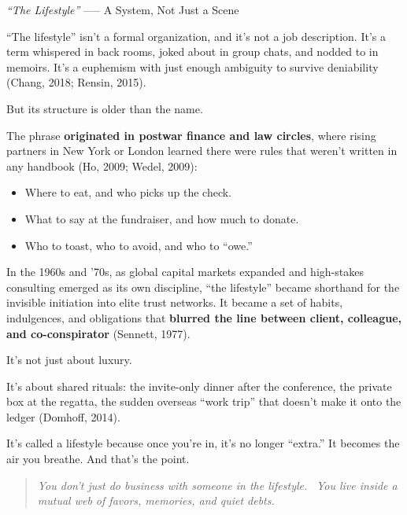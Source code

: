 \begin{HistoricalSidebar}{\textit{“The Lifestyle”} --— A System, Not Just a Scene}

  “The lifestyle” isn’t a formal organization, and it’s not a job description. It’s a term whispered in 
  back rooms, joked about in group chats, and nodded to in memoirs. It's a euphemism with just enough 
  ambiguity to survive deniability (Chang, 2018; Rensin, 2015).

  \medskip
  
  But its structure is older than the name.

  \medskip

  The phrase \textbf{originated in postwar finance and law circles}, where rising partners in New York 
  or London learned there were rules that weren’t written in any handbook (Ho, 2009; Wedel, 2009):

  \begin{itemize}
    \item Where to eat, and who picks up the check.
    \item What to say at the fundraiser, and how much to donate.
    \item Who to toast, who to avoid, and who to “owe.”
  \end{itemize}

  \medskip

  In the 1960s and ’70s, as global capital markets expanded and high-stakes consulting emerged as its own discipline, 
  “the lifestyle” became shorthand for the invisible initiation into elite trust networks. It became a set of habits, 
  indulgences, and obligations that \textbf{blurred the line between client, colleague, and co-conspirator} 
  (Sennett, 1977).

  \medskip

  It’s not just about luxury.

  \medskip

  It’s about shared rituals: the invite-only dinner after the conference, the private box at the regatta, the sudden 
  overseas “work trip” that doesn’t make it onto the ledger (Domhoff, 2014).

  \medskip

  It’s called a lifestyle because once you’re in, it’s no longer “extra.” It becomes the air you breathe. And that’s 
  the point.

  \begin{quote}
    \textit{You don’t just do business with someone in the lifestyle.} \
    \textit{You live inside a mutual web of favors, memories, and quiet debts.}
  \end{quote}


\end{HistoricalSidebar}
